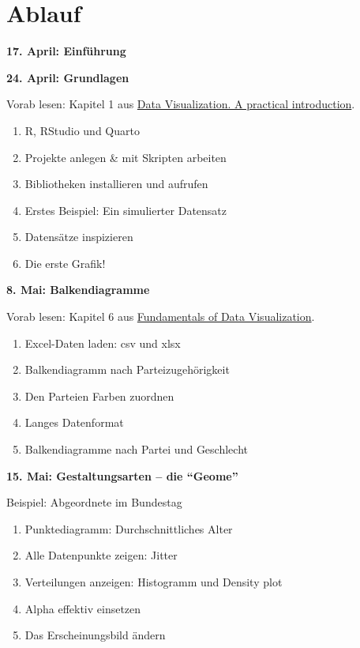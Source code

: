 \documentclass[11pt,]{scrartcl}
\providecommand{\tightlist}{%
   \setlength{\itemsep}{0pt}\setlength{\parskip}{0pt}}
\begin{document}
\section{Ablauf}\label{ablauf}

\textbf{17. April: Einführung}

\textbf{24. April: Grundlagen}

Vorab lesen: Kapitel 1 aus
\href{https://socviz.co/lookatdata.html\#lookatdata}{Data Visualization.
A practical introduction}.

\begin{enumerate}
\def\labelenumi{\alph{enumi})}
\tightlist
\item
  R, RStudio und Quarto
\item
  Projekte anlegen \& mit Skripten arbeiten
\item
  Bibliotheken installieren und aufrufen
\item
  Erstes Beispiel: Ein simulierter Datensatz
\item
  Datensätze inspizieren
\item
  Die erste Grafik!
\end{enumerate}

\textbf{8. Mai: Balkendiagramme}

Vorab lesen: Kapitel 6 aus
\href{https://clauswilke.com/dataviz/visualizing-amounts.html}{Fundamentals
of Data Visualization}.

\begin{enumerate}
\def\labelenumi{\alph{enumi})}
\tightlist
\item
  Excel-Daten laden: csv und xlsx
\item
  Balkendiagramm nach Parteizugehörigkeit
\item
  Den Parteien Farben zuordnen
\item
  Langes Datenformat
\item
  Balkendiagramme nach Partei und Geschlecht
\end{enumerate}

\textbf{15. Mai: Gestaltungsarten -- die ``Geome''}

Beispiel: Abgeordnete im Bundestag

\begin{enumerate}
\def\labelenumi{\alph{enumi})}
\tightlist
\item
  Punktediagramm: Durchschnittliches Alter
\item
  Alle Datenpunkte zeigen: Jitter
\item
  Verteilungen anzeigen: Histogramm und Density plot
\item
  Alpha effektiv einsetzen
\item
  Das Erscheinungsbild ändern
\end{enumerate}
\end{document}
